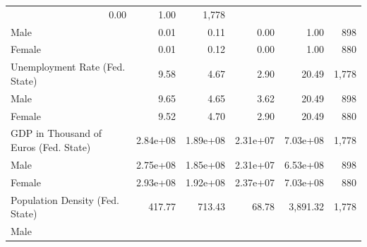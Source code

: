\documentclass[a4paper, oneside, hyperfootnotes = false]{article}
\begin{document}
{\begin{table}[ht]
\begin{center}
{\begin{tabular}{llllll}
			\multicolumn{1}{r}{0.00} &
			\multicolumn{1}{r}{1.00} &
			\multicolumn{1}{r}{1,778} \\
			\multicolumn{1}{l}{\hspace{1em}Male} &
			\multicolumn{1}{r}{0.01} &
			\multicolumn{1}{r}{0.11} &
			\multicolumn{1}{r}{0.00} &
			\multicolumn{1}{r}{1.00} &
			\multicolumn{1}{r}{898} \\
			\multicolumn{1}{l}{\hspace{1em}Female} &
			\multicolumn{1}{r}{0.01} &
			\multicolumn{1}{r}{0.12} &
			\multicolumn{1}{r}{0.00} &
			\multicolumn{1}{r}{1.00} &
			\multicolumn{1}{r}{880} \\
			\multicolumn{1}{l}{Unemployment Rate (Fed. State)} &
			\multicolumn{1}{r}{9.58} &
			\multicolumn{1}{r}{4.67} &
			\multicolumn{1}{r}{2.90} &
			\multicolumn{1}{r}{20.49} &
			\multicolumn{1}{r}{1,778} \\
			\multicolumn{1}{l}{\hspace{1em}Male} &
			\multicolumn{1}{r}{9.65} &
			\multicolumn{1}{r}{4.65} &
			\multicolumn{1}{r}{3.62} &
			\multicolumn{1}{r}{20.49} &
			\multicolumn{1}{r}{898} \\
			\multicolumn{1}{l}{\hspace{1em}Female} &
			\multicolumn{1}{r}{9.52} &
			\multicolumn{1}{r}{4.70} &
			\multicolumn{1}{r}{2.90} &
			\multicolumn{1}{r}{20.49} &
			\multicolumn{1}{r}{880} \\
			\multicolumn{1}{l}{GDP in Thousand of Euros (Fed. State)} &
			\multicolumn{1}{r}{2.84e+08} &
			\multicolumn{1}{r}{1.89e+08} &
			\multicolumn{1}{r}{2.31e+07} &
			\multicolumn{1}{r}{7.03e+08} &
			\multicolumn{1}{r}{1,778} \\
			\multicolumn{1}{l}{\hspace{1em}Male} &
			\multicolumn{1}{r}{2.75e+08} &
			\multicolumn{1}{r}{1.85e+08} &
			\multicolumn{1}{r}{2.31e+07} &
			\multicolumn{1}{r}{6.53e+08 } &
			\multicolumn{1}{r}{898} \\
			\multicolumn{1}{l}{\hspace{1em}Female} &
			\multicolumn{1}{r}{2.93e+08} &
			\multicolumn{1}{r}{1.92e+08} &
			\multicolumn{1}{r}{2.37e+07} &
			\multicolumn{1}{r}{7.03e+08} &
			\multicolumn{1}{r}{880} \\
			\multicolumn{1}{l}{Population Density (Fed. State)} &
			\multicolumn{1}{r}{417.77} &
			\multicolumn{1}{r}{713.43} &
			\multicolumn{1}{r}{68.78} &
			\multicolumn{1}{r}{3,891.32} &
			\multicolumn{1}{r}{1,778} \\
			\multicolumn{1}{l}{\hspace{1em}Male} &

\end{tabular}}
\end{center}
\end{table}}
\end{document}
